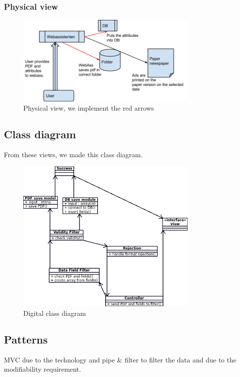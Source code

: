 \subsubsection{Physical view}
\begin{figure}[h]
\centering
\includegraphics[width=0.8\textwidth]{images/architecture02.png}
\caption{Physical view, we implement the red arrows}
\label{fig:physical_view}
\end{figure}
\newpage
\subsection{Class diagram}
From these views, we made this class diagram.
\begin{figure}[h]
\centering
\includegraphics[width=0.8\textwidth]{diagrams/class_diagram.png}
\caption{Digital class diagram}
\label{fig:class_diagram}
\end{figure}
\subsection{Patterns}
MVC due to the technology and pipe \&  filter to filter the data and due to the modifiability requirement.
